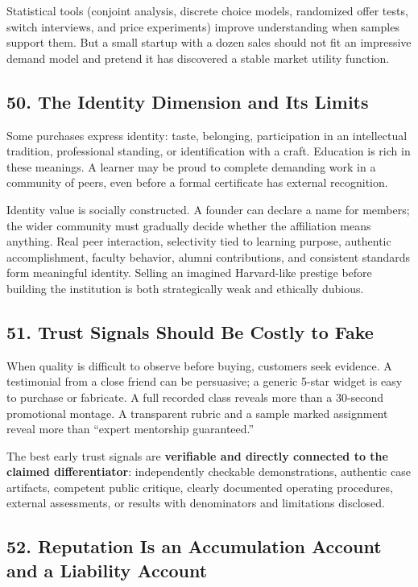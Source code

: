Statistical tools (conjoint analysis, discrete choice models, randomized offer tests, switch interviews, and price experiments) improve understanding when samples support them. But a small startup with a dozen sales should not fit an impressive demand model and pretend it has discovered a stable market utility function.

\subsection*{50. The Identity Dimension and Its Limits}

Some purchases express identity: taste, belonging, participation in an intellectual tradition, professional standing, or identification with a craft. Education is rich in these meanings. A learner may be proud to complete demanding work in a community of peers, even before a formal certificate has external recognition.

Identity value is socially constructed. A founder can declare a name for members; the wider community must gradually decide whether the affiliation means anything. Real peer interaction, selectivity tied to learning purpose, authentic accomplishment, faculty behavior, alumni contributions, and consistent standards form meaningful identity. Selling an imagined Harvard-like prestige before building the institution is both strategically weak and ethically dubious.

\subsection*{51. Trust Signals Should Be Costly to Fake}

When quality is difficult to observe before buying, customers seek evidence. A testimonial from a close friend can be persuasive; a generic 5-star widget is easy to purchase or fabricate. A full recorded class reveals more than a 30-second promotional montage. A transparent rubric and a sample marked assignment reveal more than ``expert mentorship guaranteed.''

The best early trust signals are \textbf{verifiable and directly connected to the claimed differentiator}: independently checkable demonstrations, authentic case artifacts, competent public critique, clearly documented operating procedures, external assessments, or results with denominators and limitations disclosed.

\subsection*{52. Reputation Is an Accumulation Account and a Liability Account}

